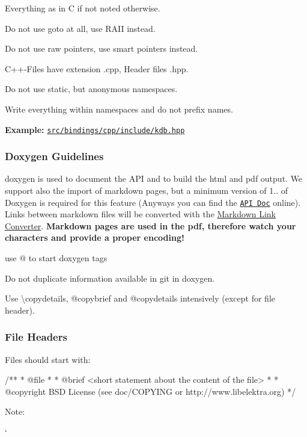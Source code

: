 \begin{DoxyItemize}
\item Everything as in C if not noted otherwise.
\item Do not use goto at all, use R\+A\+I\+I instead.
\item Do not use raw pointers, use smart pointers instead.
\item C++-\/\+Files have extension {\ttfamily .cpp}, Header files {\ttfamily .hpp}.
\item Do not use {\ttfamily static}, but anonymous namespaces.
\item Write everything within namespaces and do not prefix names.
\end{DoxyItemize}

{\bfseries Example\+:} \href{http://libelektra.org/tree/master/src/bindings/cpp/include/kdb.hpp}{\tt src/bindings/cpp/include/kdb.\+hpp}

\subsubsection*{Doxygen Guidelines}

{\ttfamily doxygen} is used to document the A\+P\+I and to build the html and pdf output. We support also the import of markdown pages, but a minimum version of 1.. of Doxygen is required for this feature (Anyways you can find the \href{http://doc.libelektra.org/api/latest/html/}{\tt A\+P\+I Doc} online). Links between markdown files will be converted with the \hyperlink{doc_markdownlinkconverter_README_md}{Markdown Link Converter}. {\bfseries Markdown pages are used in the pdf, therefore watch your characters and provide a proper encoding!}


\begin{DoxyItemize}
\item use {\ttfamily @} to start doxygen tags
\item Do not duplicate information available in git in doxygen.
\item Use {\ttfamily \textbackslash{}copydetails}, {\ttfamily @copybrief} and {\ttfamily @copydetails} intensively (except for file header).
\end{DoxyItemize}

\subsubsection*{File Headers}

Files should start with\+:

\begin{DoxyVerb}        /**
         * @file
         *
         * @brief <short statement about the content of the file>
         *
         * @copyright BSD License (see doc/COPYING or http://www.libelektra.org)
         */\end{DoxyVerb}


Note\+:


\begin{DoxyItemize}
\item ` 
\end{DoxyItemize}